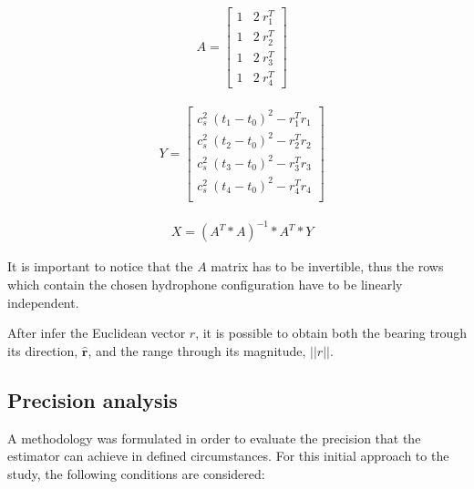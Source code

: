 \begin{eqnarray}
& A = 
\begin{bmatrix}
1 & 2\: r_1^{T}\\
1 & 2\: r_2^{T}\\
1 & 2\: r_3^{T}\\
1 & 2\: r_4^{T}
\end{bmatrix}
\label{eq:A}
\end{eqnarray}

\begin{eqnarray}
& Y = 
\begin{bmatrix}
c_s^{2}\: (t_1-t_0)^2 - r_1^{T} r_1\\
c_s^{2}\: (t_2-t_0)^2 - r_2^{T} r_2\\
c_s^{2}\: (t_3-t_0)^2 - r_3^{T} r_3\\
c_s^{2}\: (t_4-t_0)^2 - r_4^{T} r_4\\
\end{bmatrix}
\label{eq:Y}
\end{eqnarray}

\begin{eqnarray}
& X = (A^{T}*A)^{-1}*A^{T}*Y
\label{eq:least-square}
\end{eqnarray}

It is important to notice that the $A$ matrix has to be invertible, thus the rows which contain the chosen hydrophone configuration have to be linearly independent.

After infer the Euclidean vector $r$, it is possible to obtain both the bearing trough its direction, $\hat{\boldsymbol{r}}$, and the range through its magnitude, $||r||$.

\subsection{Precision analysis}  \label{subchap:precision-analy}

A methodology was formulated in order to evaluate the precision that the estimator can achieve in defined circumstances. For this initial approach to the study, the following conditions are considered: 

